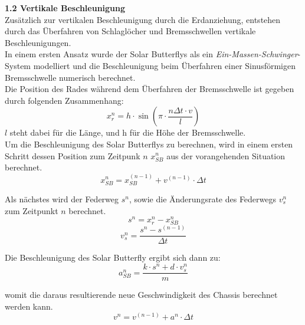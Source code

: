 \begin{description}

  \item \textbf{1.2 Vertikale Beschleunigung}\\
  Zusätzlich zur vertikalen Beschleunigung durch die Erdanziehung, entstehen durch das Überfahren von Schlaglöcher und Bremsschwellen vertikale Beschleunigungen.\\
  In einem ersten Ansatz wurde der Solar Butterflys als ein \emph{Ein-Massen-Schwinger}-System modelliert und die Beschleunigung beim Überfahren einer Sinusförmigen Bremsschwelle numerisch berechnet.\\

  Die Position des Rades während dem Überfahren der Bremsschwelle ist gegeben durch folgenden Zusammenhang:
  \begin{equation}
    x_r^n = h \cdot \sin(\pi \cdot \frac{n\Delta t \cdot v}{l})
  \end{equation}
  $l$ steht dabei für die Länge, und h für die Höhe der Bremsschwelle.\\

  Um die Beschleunigung des Solar Butterflys zu berechnen, wird in einem ersten Schritt dessen Position zum Zeitpunk $n$ $x_{SB}^n$ aus der vorangehenden Situation berechnet.
  \begin{equation}
    x_{SB}^n = x_{SB}^{(n-1)} + v^{(n-1)} \cdot \Delta t
  \end{equation}

  Als nächstes wird der Federweg $s^n$, sowie die Änderungsrate des Federwegs $v_s^n$ zum Zeitpunkt $n$ berechnet.
  \begin{equation}
    s^n = x_r^n - x_{SB}^n
  \end{equation}
  \begin{equation}
    v_s^n = \frac{s^n - s^{(n-1)}}{\Delta t}
  \end{equation}

  Die Beschleunigung des Solar Butterfly ergibt sich dann zu:\\
  \begin{equation}
    a_{SB}^n = \frac{k \cdot s^n + d \cdot v_s^n}{m}
  \end{equation}

  womit die daraus resultierende neue Geschwindigkeit des Chassis berechnet werden kann.
  \begin{equation}
    v^n = v^{(n-1)} + a^n \cdot \Delta t
  \end{equation}


\end{description}
